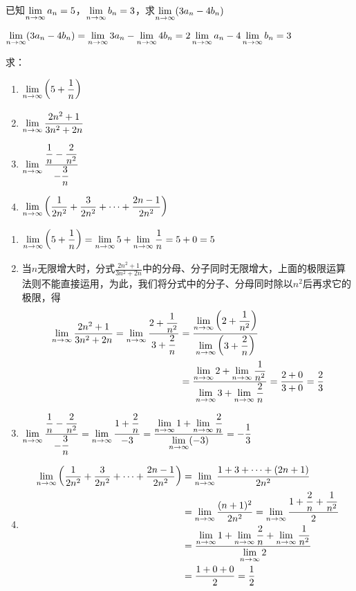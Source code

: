 \begin{example}
已知$ \lim\limits_{n\to \infty} a_n=5$，$ \lim\limits_{n\to \infty} b_n=3$，求$ \lim\limits_{n\to \infty} (3a_n-4b_n)$
\end{example}

\begin{solution}
$ \lim\limits_{n\to \infty} (3a_n-4b_n)= \lim\limits_{n\to \infty} 3a_n- \lim\limits_{n\to \infty} 4b_n=2 \lim\limits_{n\to \infty} a_n-4 \lim\limits_{n\to \infty} b_n=3$
\end{solution}

\begin{example}
求：
\begin{multicols}{2}
\begin{enumerate}[(1)]
    \item $ \lim\limits_{n\to \infty} \left(5+\dfrac{1}{n}\right)  $
    \item $ \lim\limits_{n\to \infty} \dfrac{2n^2+1}{3n^2+2n}  $
    \item $ \lim\limits_{n\to \infty} \dfrac{\dfrac{1}{n}-\dfrac{2}{n^2}}{-\dfrac{3}{n}}  $
    \item $ \lim\limits_{n\to \infty} \left(\dfrac{1}{2n^2}+\dfrac{3}{2n^2}+\cdots +\dfrac{2n-1}{2n^2}\right)  $
\end{enumerate}
\end{multicols}
\end{example}

\begin{solution}
\begin{enumerate}[(1)]
    \item $\lim\limits_{n\to \infty} \left(5+\dfrac{1}{n}\right) =\lim\limits_{n\to \infty} 5+\lim\limits_{n\to \infty} \dfrac{1}{n}=5+0=5 $
\item 当$n$无限增大时，分式$\frac{2n^2+1}{3n^2+2n}$中的分母、分子同时无限增大，上面的极限运算法则不能直接运用，为此，我们将分式中的分子、分母同时除以$n^2$后再求它的极限，得
\[\begin{split}
    \lim\limits_{n\to \infty} \dfrac{2n^2+1}{3n^2+2n}  =\lim\limits_{n\to \infty} \dfrac{2+\dfrac{1}{n^2}}{3+\dfrac{2}{n}}&=\dfrac{\lim\limits_{n\to \infty} \left(2+\dfrac{1}{n^2}\right)}{\lim\limits_{n\to \infty} \left(3+\dfrac{2}{n}\right)} \\
    &=\dfrac{\lim\limits_{n\to \infty} 2+\lim\limits_{n\to \infty} \dfrac{1}{n^2}}{\lim\limits_{n\to \infty} 3+\lim\limits_{n\to \infty} \dfrac{2}{n}}=\dfrac{2+0}{3+0}=\dfrac{2}{3} 
\end{split}\]
\item $ \lim\limits_{n\to \infty} \dfrac{\dfrac{1}{n}-\dfrac{2}{n^2}}{-\dfrac{3}{n}}= \lim\limits_{n\to \infty} \dfrac{1+\dfrac{2}{n}}{-3}=\dfrac{ \lim\limits_{n\to \infty} 1+ \lim\limits_{n\to \infty} \dfrac{2}{n}}{ \lim\limits_{n\to \infty} (-3)}=-\dfrac{1}{3}$
\item \[\begin{split}
    \lim\limits_{n\to \infty}  \left(\dfrac{1}{2n^2}+\dfrac{3}{2n^2}+\cdots +\dfrac{2n-1}{2n^2}\right) &= \lim\limits_{n\to \infty} \dfrac{1+3+\cdots+(2n+1)}{2n^2}\\
    &= \lim\limits_{n\to \infty} \dfrac{(n+1)^2}{2n^2}= \lim\limits_{n\to \infty} \dfrac{1+\dfrac{2}{n}+\dfrac{1}{n^2}}{2}\\
    &=\dfrac{ \lim\limits_{n\to \infty} 1+ \lim\limits_{n\to \infty} \dfrac{2}{n}+ \lim\limits_{n\to \infty} \dfrac{1}{n^2}}{ \lim\limits_{n\to \infty} 2}\\
    &=\dfrac{1+0+0}{2}=\dfrac{1}{2}
\end{split}\]
\end{enumerate}    
\end{solution}


